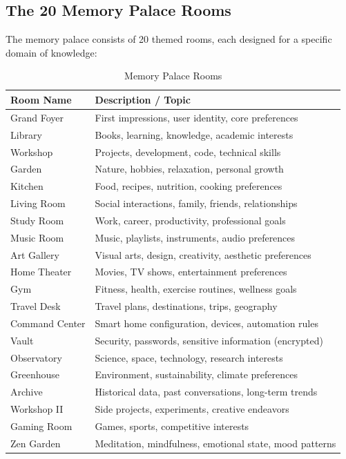 \documentclass[12pt,a4paper,twoside]{report}
\begin{document}
\subsection{The 20 Memory Palace Rooms}

The memory palace consists of 20 themed rooms, each designed for a specific domain of knowledge:

\begin{table}[H]
\centering
\begin{tabularx}{\textwidth}{|l|X|}
\hline
\rowcolor{phiblue!20}
\textbf{Room Name} & \textbf{Description / Topic} \\
\hline
Grand Foyer & First impressions, user identity, core preferences \\
\hline
Library & Books, learning, knowledge, academic interests \\
\hline
Workshop & Projects, development, code, technical skills \\
\hline
Garden & Nature, hobbies, relaxation, personal growth \\
\hline
Kitchen & Food, recipes, nutrition, cooking preferences \\
\hline
Living Room & Social interactions, family, friends, relationships \\
\hline
Study Room & Work, career, productivity, professional goals \\
\hline
Music Room & Music, playlists, instruments, audio preferences \\
\hline
Art Gallery & Visual arts, design, creativity, aesthetic preferences \\
\hline
Home Theater & Movies, TV shows, entertainment preferences \\
\hline
Gym & Fitness, health, exercise routines, wellness goals \\
\hline
Travel Desk & Travel plans, destinations, trips, geography \\
\hline
Command Center & Smart home configuration, devices, automation rules \\
\hline
Vault & Security, passwords, sensitive information (encrypted) \\
\hline
Observatory & Science, space, technology, research interests \\
\hline
Greenhouse & Environment, sustainability, climate preferences \\
\hline
Archive & Historical data, past conversations, long-term trends \\
\hline
Workshop II & Side projects, experiments, creative endeavors \\
\hline
Gaming Room & Games, sports, competitive interests \\
\hline
Zen Garden & Meditation, mindfulness, emotional state, mood patterns \\
\hline
\end{tabularx}
\caption{Memory Palace Rooms}
\end{table}
\end{document}

